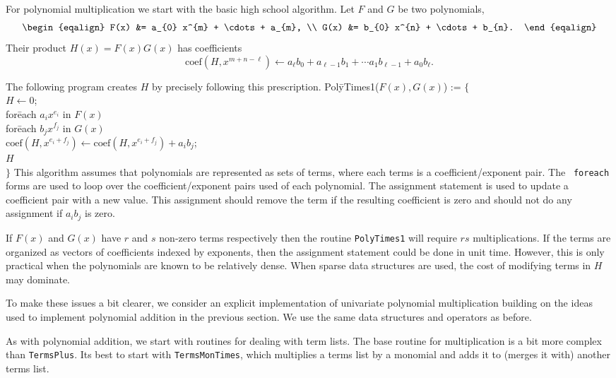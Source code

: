 For polynomial multiplication we start with the basic high school
algorithm.  Let $F$ and $G$ be two polynomials, 
\[
\begin{eqalign}
F(x) &= a_{0} x^{m} + \cdots + a_{m}, \\
G(x) &= b_{0} x^{n} + \cdots + b_{n}.
\end{eqalign}
\]
Their product $H(x) = F(x) G(x)$ has coefficients
\[
\mbox{coef}(H, x^{m+n-\ell}) \leftarrow a_{\ell} b_{0} + a_{\ell-1} b_{1} + \cdots
 a_{1} b_{\ell-1} + a_{0} b_{\ell}.
\]

The following program creates $H$ by precisely following this prescription.
\begindsacode
Pol\=yTimes1($F(x), G(x)$) := $\{$\\
\> $H \leftarrow 0$; \\
\> for\=each $a_{i}x^{e_{i}}$ in $F(x)$ \\
\> \> for\=each $b_{j} x^{f_{j}}$ in $G(x)$ \\
\> \> \> $\mbox{coef}(H, x^{e_{i}+f_{j}}) \leftarrow
    \mbox{coef}(H, x^{e_{i}+f_{j}}) + a_{i} b_{j}$; \\
\> $H$ \\
\> $\}$
\enddsacode
\label{PolyTimes1:Alg}
\noindent
This algorithm assumes that polynomials are represented as sets of
terms, where each terms is a coefficient/exponent pair.  The {\tt
foreach} forms are used to loop over the coefficient/exponent pairs
used of each polynomial.  The assignment statement is used to update a
coefficient pair with a new value.  This assignment should remove the
term if the resulting coefficient is zero and should not do any
assignment if $a_{i} b_{j}$ is zero.

If $F(x)$ and $G(x)$ have $r$ and $s$ non-zero terms respectively then
the routine {\tt PolyTimes1} will require $rs$ multiplications.  If
the terms are organized as vectors of coefficients indexed by
exponents, then the assignment statement could be done in unit time.
However, this is only practical when the polynomials are known to be
relatively dense.  When sparse data structures are used, the cost of
modifying terms in $H$ may dominate.

To make these issues a bit clearer, we consider an explicit
implementation of univariate polynomial multiplication building on the
ideas used to implement polynomial addition in the previous section.
We use the same data structures and operators as before. 

As with polynomial addition, we start with routines for dealing with
term lists.  The base routine for multiplication is a bit more complex
than {\tt TermsPlus}.  Its best to start with {\tt TermsMonTimes},
which multiplies a terms list by a monomial and adds it to (merges it
with) another terms list.

